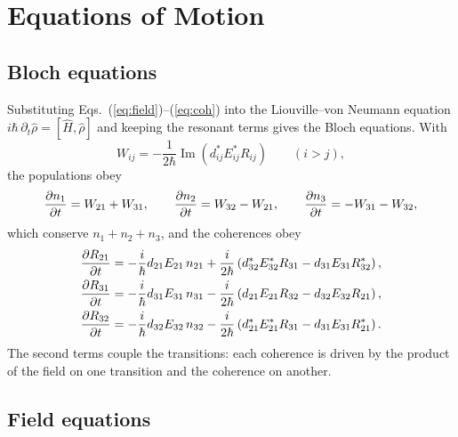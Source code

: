 \documentclass[12pt,a4paper]{article}
\begin{document}
\section{Equations of Motion}

\subsection{Bloch equations}

Substituting Eqs.~(\ref{eq:field})--(\ref{eq:coh}) into the Liouville--von
Neumann equation $i\hbar\,\partial_t\hat{\rho} = [\hat{H},\hat{\rho}]$ and
keeping the resonant terms gives the Bloch equations. With
\begin{equation}
  W_{ij} = -\frac{1}{2\hbar}\operatorname{Im}\!\left(d_{ij}^* E_{ij}^* R_{ij}\right)
  \qquad (i > j),
  \label{eq:W}
\end{equation}
the populations obey
\begin{equation}
  \dfrac{\partial n_1}{\partial t} = W_{21} + W_{31}, \qquad
  \dfrac{\partial n_2}{\partial t} = W_{32} - W_{21}, \qquad
  \dfrac{\partial n_3}{\partial t} = -W_{31} - W_{32},
  \label{eq:pop}
\end{equation}
which conserve $n_1 + n_2 + n_3$, and the coherences obey
\begin{align}
  \dfrac{\partial R_{21}}{\partial t} &= -\frac{i}{\hbar}d_{21}E_{21}\,n_{21}
     + \frac{i}{2\hbar}\left(d_{32}^*E_{32}^*R_{31} - d_{31}E_{31}R_{32}^*\right),\\
  \dfrac{\partial R_{31}}{\partial t} &= -\frac{i}{\hbar}d_{31}E_{31}\,n_{31}
     - \frac{i}{2\hbar}\left(d_{21}E_{21}R_{32} - d_{32}E_{32}R_{21}\right),\\
  \dfrac{\partial R_{32}}{\partial t} &= -\frac{i}{\hbar}d_{32}E_{32}\,n_{32}
     - \frac{i}{2\hbar}\left(d_{21}^*E_{21}^*R_{31} - d_{31}E_{31}R_{21}^*\right).
\end{align}
The second terms couple the transitions: each coherence is driven by the
product of the field on one transition and the coherence on another.

\subsection{Field equations}
\end{document}
